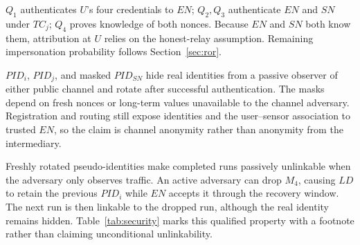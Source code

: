 \documentclass[cmc,article,submit,moreauthors,pdftex]{Definitions/tsp}
\providecommand{\DIFdel}[1]{{\protect\color{red} \scriptsize #1}} %
\begin{document}

\DIFdel{$Q_1$ authenticates $U$'s four credentials to $EN$; $Q_2,Q_3$ authenticate $EN$ and $SN$ under $TC_j$; $Q_4$ proves knowledge of both nonces. Because $EN$ and $SN$ both know them, attribution at $U$ relies on the honest-relay assumption. Remaining impersonation probability follows Section~\ref{sec:ror}.
}%


\DIFdel{$PID_i$, $PID_j$, and masked $PID_{SN}$ hide real identities from a passive observer of either public channel and rotate after successful authentication. The masks depend on fresh nonces or long-term values unavailable to the channel adversary. Registration and routing still expose identities and the user--sensor association to trusted $EN$, so the claim is channel anonymity rather than anonymity from the intermediary.
}%


\DIFdel{Freshly rotated pseudo-identities make completed runs passively unlinkable when the adversary only observes traffic. An active adversary can drop $M_4$, causing $LD$ to retain the previous $PID_i$ while $EN$ accepts it through the recovery window. The next run is then linkable to the dropped run, although the real identity remains hidden. Table~\ref{tab:security} marks this qualified property with a footnote rather than claiming unconditional unlinkability. }%

\end{document}
